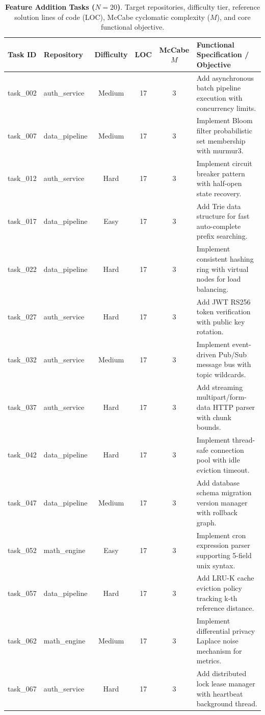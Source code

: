 \begin{table}[t]
\centering
\scriptsize
\caption{\textbf{Feature Addition Tasks ($N=20$)}. Target repositories, difficulty tier, reference solution lines of code (LOC), McCabe cyclomatic complexity ($M$), and core functional objective.}
\label{tab:tasks_feature}
\begin{tabular}{llcccl}
\toprule
\textbf{Task ID} & \textbf{Repository} & \textbf{Difficulty} & \textbf{LOC} & \textbf{McCabe $M$} & \textbf{Functional Specification / Objective} \\
\midrule
task\_002 & auth\_service & Medium & 17 & 3 & Add asynchronous batch pipeline execution with concurrency limits. \\
task\_007 & data\_pipeline & Medium & 17 & 3 & Implement Bloom filter probabilistic set membership with murmur3. \\
task\_012 & auth\_service & Hard & 17 & 3 & Implement circuit breaker pattern with half-open state recovery. \\
task\_017 & data\_pipeline & Easy & 17 & 3 & Add Trie data structure for fast auto-complete prefix searching. \\
task\_022 & data\_pipeline & Hard & 17 & 3 & Implement consistent hashing ring with virtual nodes for load balancing. \\
task\_027 & auth\_service & Hard & 17 & 3 & Add JWT RS256 token verification with public key rotation. \\
task\_032 & auth\_service & Medium & 17 & 3 & Implement event-driven Pub/Sub message bus with topic wildcards. \\
task\_037 & auth\_service & Hard & 17 & 3 & Add streaming multipart/form-data HTTP parser with chunk bounds. \\
task\_042 & data\_pipeline & Hard & 17 & 3 & Implement thread-safe connection pool with idle eviction timeout. \\
task\_047 & data\_pipeline & Medium & 17 & 3 & Add database schema migration version manager with rollback graph. \\
task\_052 & math\_engine & Easy & 17 & 3 & Implement cron expression parser supporting 5-field unix syntax. \\
task\_057 & data\_pipeline & Hard & 17 & 3 & Add LRU-K cache eviction policy tracking k-th reference distance. \\
task\_062 & math\_engine & Medium & 17 & 3 & Implement differential privacy Laplace noise mechanism for metrics. \\
task\_067 & auth\_service & Hard & 17 & 3 & Add distributed lock lease manager with heartbeat background thread. \\

\end{tabular}
\end{table}
